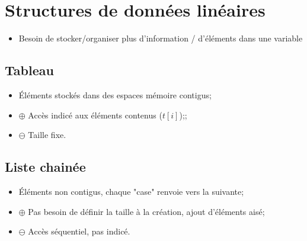 \documentclass[12pt,a4paper]{article}
\date{}
\begin{document}


\section{Structures de données linéaires}

\begin{itemize}
	\item Besoin de stocker/organiser plus d'information / d'éléments dans une variable
\end{itemize}

\subsection{Tableau}
	\begin{itemize}
		\item Éléments stockés dans des espaces mémoire contigus;
		\item $\oplus$  Accès indicé aux éléments contenus ($t[i]$);;
		\item $\ominus$ Taille fixe.
	\end{itemize}
	

\subsection{Liste chainée}

	\begin{itemize}
		\item \'Eléments non contigus, chaque "case" renvoie vers la suivante;
		\item  $\oplus$ Pas besoin de définir la taille à la création, ajout d'éléments aisé;
		\item $\ominus$ Accès séquentiel, pas indicé.
	\end{itemize}
\end{document}
